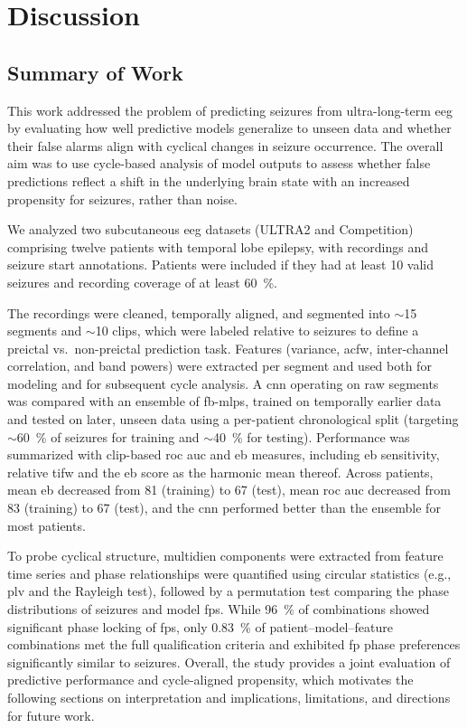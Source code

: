 \chapter{Discussion}\label{ch:discussion}


\section{Summary of Work}
This work addressed the problem of predicting seizures from ultra-long-term \gls{eeg} by evaluating how well predictive models generalize to unseen data and whether their false alarms align with cyclical changes in seizure occurrence.
The overall aim was to use cycle-based analysis of model outputs to assess whether false predictions reflect a shift in the underlying brain state with an increased propensity for seizures, rather than noise.

We analyzed two subcutaneous \gls{eeg} datasets (ULTRA2 and Competition) comprising twelve patients with temporal lobe epilepsy, with recordings and seizure start annotations.
Patients were included if they had at least 10 valid seizures and recording coverage of at least \SI{60}{\percent}.

The recordings were cleaned, temporally aligned, and segmented into $\sim$\SI{15}{\sec} segments and $\sim$\SI{10}{\min} clips, which were labeled relative to seizures to define a preictal vs.\ non-preictal prediction task.
Features (variance, \gls{acfw}, inter-channel correlation, and band powers) were extracted per segment and used both for modeling and for subsequent cycle analysis.
A \gls{cnn} operating on raw segments was compared with an ensemble of \glspl{fb-mlp}, trained on temporally earlier data and tested on later, unseen data using a per-patient chronological split (targeting $\sim$\SI{60}{\percent} of seizures for training and $\sim$\SI{40}{\percent} for testing).
Performance was summarized with clip-based \gls{roc auc} and \gls{eb} measures, including \gls{eb} sensitivity, relative \gls{tifw} and the \gls{eb} score as the harmonic mean thereof.
Across patients, mean \gls{eb} decreased from 81 (training) to 67 (test), mean \gls{roc auc} decreased from 83 (training) to 67 (test), and the \gls{cnn} performed better than the ensemble for most patients.

To probe cyclical structure, multidien components were extracted from feature time series and phase relationships were quantified using circular statistics (e.g., \gls{plv} and the Rayleigh test), followed by a permutation test comparing the phase distributions of seizures and model \glspl{fp}.
While \SI{96}{\percent} of combinations showed significant phase locking of \glspl{fp}, only \SI{0.83}{\percent} of patient--model--feature combinations met the full qualification criteria and exhibited \gls{fp} phase preferences significantly similar to seizures.
Overall, the study provides a joint evaluation of predictive performance and cycle-aligned propensity, which motivates the following sections on interpretation and implications, limitations, and directions for future work.


